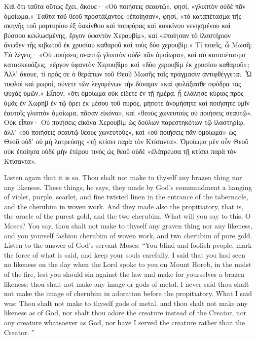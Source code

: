 \documentclass[10pt]{book}
\newcommand{\switchGreek}[1][]{\selectlanguage{polutonikogreek} \switchcolumn*[#1]}
\newcommand{\switchEnglish}{\selectlanguage{english} \switchcolumn}
\begin{document}
\begin{paracol}{2}
\switchGreek

Καὶ ὅτι ταῦτα οὕτως ἔχει, ἄκουε· «Οὐ ποιήσεις σεαυτῷ», φησί, «γλυπτὸν οὐδὲ πᾶν
ὁμοίωμα.» Ταῦτα τοῦ θεοῦ προστάξαντος «ἐποίησαν», φησί, «τὸ καταπέτασμα τῆς
σκηνῆς τοῦ μαρτυρίου ἐξ ὑακίνθου καὶ πορφύρας καὶ κοκκίνου νενησμένου καὶ
βύσσου κεκλωσμένης, ἔργον ὑφαντὸν Χερουβίμ», καὶ «ἐποίησαν τὸ ἱλαστήριον
ἄνωθεν τῆς κιβωτοῦ ἐκ χρυσίου καθαροῦ καὶ τοὺς δύο χερουβίμ.» Τί ποιεῖς, ὦ
Μωσῆ; Σὺ λέγεις· «Οὐ ποιήσεις σεαυτῷ γλυπτὸν οὐδὲ πᾶν ὁμοίωμα», καὶ σὺ
καταπέτασμα κατασκευάζεις, «ἔργον ὑφαντὸν Χερουβὶμ» καὶ «δύο χερουβὶμ ἐκ
χρυσίου καθαροῦ»; Ἀλλ’ ἄκουε, τί πρός σε ὁ θεράπων τοῦ Θεοῦ Μωσῆς τοῖς
πράγμασιν ἀντιφθέγγεται. Ὦ τυφλοὶ καὶ μωροί, σύνετε τῶν λεγομένων τὴν δύναμιν
«καὶ φυλάξασθε σφόδρα τὰς ψυχὰς ὑμῶν.» Εἶπον, «ὅτι ὁμοίωμα οὐκ εἴδετε ἐν τῇ
ἡμέρᾳ, ᾗ ἐλάλησε κύριος πρὸς ὑμᾶς ἐν Χωρὴβ ἐν τῷ ὄρει ἐκ μέσου τοῦ πυρός,
μήποτε ἀνομήσητε καὶ ποιήσητε ὑμῖν ἑαυτοῖς γλυπτὸν ὁμοίωμα, πᾶσαν εἰκόνα», καὶ
«θεοὺς χωνευτοὺς οὐ ποιήσεις σεαυτῷ». Οὐκ εἶπον· Οὐ ποιήσεις εἰκόνα Χερουβὶμ
ὡς δούλων παρεστηκότων τῷ ἱλαστηρίῳ, ἀλλ’ «οὐ ποιήσεις σεαυτῷ θεοὺς
χωνευτούς», καὶ «οὐ ποιήσεις πᾶν ὁμοίωμα» ὡς Θεοῦ οὐδ’ οὐ μὴ λατρεύσῃς «τῇ
κτίσει παρὰ τὸν Κτίσαντα». Ὁμοίωμα μὲν οὖν Θεοῦ οὐκ ἐποίησα οὐδὲ μὴν ἑτέρου
τινὸς ὡς θεοῦ οὐδὲ «ἐλάτρευσα τῇ κτίσει παρὰ τὸν Κτίσαντα».

\switchEnglish

Listen again that it is so. Thou shalt not 
make to thyself any brazen thing nor any 
likeness. These things, he says, they made 
by God's commandment a hanging of violet, 
purple, scarlet, and fine twisted linen in the 
entrance of the tabernacle, and the cherubim 
in woven work. And they made also the 
propitiatory, that is, the oracle of the purest 
gold, and the two cherubim. What will you 
say to this, O Moses? You say, thou shalt 
not make to thyself any graven thing nor any 
likeness, and you yourself fashion cherubim of 
woven work, and two cherubim of pure gold. 
Listen to the answer of God's servant Moses: 
``You blind and foolish people, mark the force 
of what is said, and keep your souls carefully. 
I said that you had seen no likeness on the 
day when the Lord spoke to you on Mount 
Horeb, in the midst of the fire, lest you should 
sin against the law and make for yourselves a 
brazen likeness: thou shalt not make any 
image or gods of metal. I never said thou 
shalt not make the image of cherubim in 
adoration before the propitiatory. What I 
said was: Thou shalt not make to thyself 
gods of metal, and thou shalt not make any 
likeness as of God, nor shalt thou adore 
the creature instead of the Creator, nor 
any creature whatsoever as God, nor have 
I served the creature rather than the Creator. ''


\end{paracol}
\end{document}
